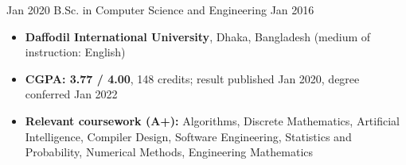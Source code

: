 %
%
%


\begin{experiences}
    \mentoring
        {Jan 2020}
        {B.Sc. in Computer Science and Engineering}
        {Jan 2016}
        {
            \begin{itemize}
                \item \textbf{Daffodil International University}, Dhaka, Bangladesh
                    (medium of instruction: English)
                \item \textbf{CGPA: 3.77 / 4.00}, 148 credits; result published Jan 2020,
                    degree conferred Jan 2022
                \item \textbf{Relevant coursework (A+):} Algorithms, Discrete Mathematics,
                    Artificial Intelligence, Compiler Design, Software Engineering,
                    Statistics and Probability, Numerical Methods, Engineering Mathematics
            \end{itemize}
        }
\end{experiences}
